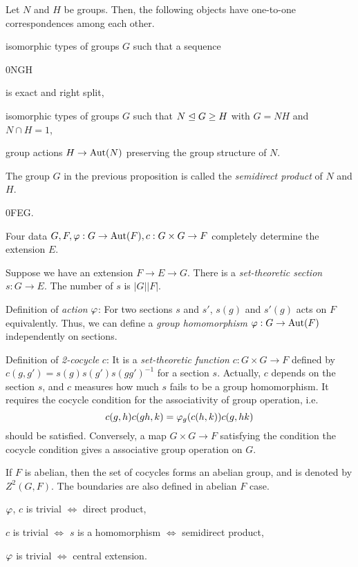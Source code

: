 \documentclass{../note}
\begin{document}
\begin{prop}
Let $N$ and $H$ be groups.
Then, the following objects have one-to-one correspondences among each other.
\begin{parts}
\item isomorphic types of groups $G$ such that a sequence \begin{es}0\>N\>G\>H\end{es} is exact and right split,
\item isomorphic types of groups $G$ such that $N\trianglelefteq G\ge H$ with $G=NH$ and $N\cap H=1$,
\item group actions $H\to\operatorname{Aut}(N)$ preserving the group structure of $N$.
\end{parts}
\end{prop}
\begin{defn}
The group $G$ in the previous proposition is called the \emph{semidirect product} of $N$ and $H$.
\end{defn}


\begin{es}
0\>F\>E\>G.
\end{es}
Four data $G,F,\varphi:G\to\operatorname{Aut}(F),c:G\times G\to F$ completely determine the extension $E$.

Suppose we have an extension $F\to E\to G$.
There is a \emph{set-theoretic section} $s:G\to E$.
The number of $s$ is $|G||F|$.

Definition of \emph{action} $\varphi$:
For two sections $s$ and $s'$, $s(g)$ and $s'(g)$ acts on $F$ equivalently.
Thus, we can define a \emph{group homomorphism} $\varphi:G\to\operatorname{Aut}(F)$ independently on sections.

Definition of \emph{2-cocycle} $c$:
It is a \emph{set-theoretic function} $c:G\times G\to F$ defined by $c(g,g')=s(g)s(g')s(gg')^{-1}$ for a section $s$.
Actually, $c$ depends on the section $s$, and $c$ measures how much $s$ fails to be a group homomorphism.
It requires the cocycle condition for the associativity of group operation, i.e.
\[c(g,h)c(gh,k)=\varphi_g(c(h,k))c(g,hk)\]
should be satisfied.
Conversely, a map $G\times G\to F$ satisfying the condition the cocycle condition gives a associative group operation on $G$.

If $F$ is abelian, then the set of cocycles forms an abelian group, and is denoted by $Z^2(G,F)$.
The boundaries are also defined in abelian $F$ case.


\begin{parts}
\item $\varphi$, $c$ is trivial $\iff$ direct product,
\item $c$ is trivial $\iff$ $s$ is a homomorphism $\iff$ semidirect product,
\item $\varphi$ is trivial $\iff$ central extension.
\end{parts}
\end{document}

